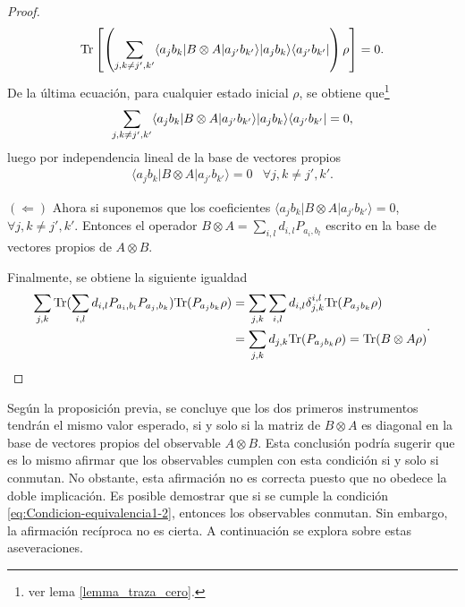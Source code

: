 \begin{proof}
\[\begin{split}
    {\rm Tr}\left[\left(\sum_{j,k\ne j',k'}  \langle a_j b_k |B\otimes A|a_{j'}b_{k'}\rangle |a_j b_k\rangle \langle a_{j'}b_{k'}|\right)\rho\right]&=0.\\
    \end{split}\]
    De la última ecuación, para cualquier estado inicial $\rho$, se obtiene que\footnote[1]{ver lema {\ref{lemma_traza_cero}}.} 
    \[\sum_{j,k\ne j', k'} \langle a_j b_k |B\otimes A|a_{j'}b_{k'}\rangle |a_j b_k\rangle \langle a_{j'}b_{k'}|=0,\] luego por independencia lineal de la base de vectores propios  
     \[\begin{array}{cc}
        \langle a_j b_k |B\otimes A|a_{j'}b_{k'}\rangle=0& \forall j,k\ne j',k'.\end{array}\]

        $(\Leftarrow)$
        Ahora si suponemos que los coeficientes  $\langle a_j b_k |B\otimes A|a_{j'}b_{k'}\rangle=0$,  $\forall j,k\ne j',k'$. Entonces el operador $B\otimes A=\sum_{i,l}d_{i,l}P_{a_i, b_l}$ escrito en la base de vectores propios de $A\otimes B$.
        
        Finalmente, se obtiene la siguiente igualdad \[\begin{split}\sum_{j,k}{\rm Tr}( \sum_{i,l}d_{i,l}P_{a_i, b_l} P_{a_j,b_k}){\rm Tr}(P_{a_j b_k}\rho )&=\sum_{j,k}\sum_{i,l}d_{i,l}\delta_{j,k}^{i,l}{\rm Tr}(P_{a_j b_k}\rho )\\&=\sum_{j,k}d_{j,k}{\rm Tr}(P_{a_j b_k}\rho )={\rm Tr}(B\otimes A\rho)\end{split}.\]


\end{proof}


Según la proposición previa, se concluye que los dos primeros instrumentos tendrán el mismo valor esperado, si y solo si la matriz de $B\otimes A$ es diagonal en la base de vectores propios del observable $A\otimes B$. Esta conclusión podría sugerir que es lo mismo afirmar que los observables cumplen con esta condición si y solo si conmutan. No obstante, esta afirmación no es correcta puesto que no obedece la doble implicación. Es posible demostrar que si se cumple la condición {\eqref{eq:Condicion-equivalencia1-2}}, entonces los observables conmutan. Sin embargo, la afirmación recíproca no es cierta. A continuación se explora sobre estas aseveraciones.

